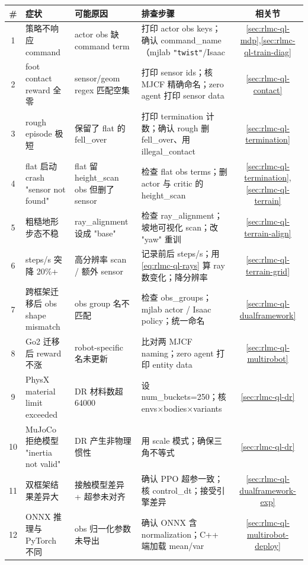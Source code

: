 \begin{center}
\small
\begin{tabular}{@{}cp{3.2cm}p{3.4cm}p{4.2cm}c@{}}
\toprule
\# & 症状 & 可能原因 & 排查步骤 & 相关节 \\
\midrule
1 & 策略不响应 command & actor obs 缺 command term & 打印 actor obs keys；确认 command\_name（mjlab \verb|"twist"|/Isaac \Verb[breaklines]|"base_velocity"|） & \cref{sec:rlmc-ql-mdp},\cref{sec:rlmc-ql-train-diag} \\
2 & foot contact reward 全零 & sensor/geom regex 匹配空集 & 打印 sensor ids；核 MJCF 精确命名；zero agent 打印 sensor data & \cref{sec:rlmc-ql-contact} \\
3 & rough episode 极短 & 保留了 flat 的 fell\_over & 打印 termination 计数；确认 rough 删 fell\_over、用 illegal\_contact & \cref{sec:rlmc-ql-termination} \\
4 & flat 启动 crash "sensor not found" & flat 留 height\_scan obs 但删了 sensor & 检查 flat obs terms；删 actor 与 critic 的 height\_scan & \cref{sec:rlmc-ql-termination},\cref{sec:rlmc-ql-terrain} \\
5 & 粗糙地形步态不稳 & ray\_alignment 设成 "base" & 检查 ray\_alignment；坡地可视化 scan；改 "yaw" 重训 & \cref{sec:rlmc-ql-terrain-align} \\
6 & steps/s 突降 20\%+ & 高分辨率 scan / 额外 sensor & 记录前后 steps/s；用 \eqref{eq:rlmc-ql-rays} 算 ray 数变化；降分辨率 & \cref{sec:rlmc-ql-terrain-grid} \\
7 & 跨框架迁移后 obs shape mismatch & obs group 名不匹配 & 检查 obs\_groups；mjlab actor / Isaac policy；统一命名 & \cref{sec:rlmc-ql-dualframework} \\
8 & Go2 迁移后 reward 不涨 & robot-specific 名未更新 & 比对两 MJCF naming；zero agent 打印 entity data & \cref{sec:rlmc-ql-multirobot} \\
9 & PhysX material limit exceeded & DR 材料数超 64000 & 设 num\_buckets=250；核 envs$\times$bodies$\times$variants & \cref{sec:rlmc-ql-dr} \\
10 & MuJoCo 拒绝模型 "inertia not valid" & DR 产生非物理惯性 & 用 scale 模式；确保三角不等式 & \cref{sec:rlmc-ql-dr} \\
11 & 双框架结果差异大 & 接触模型差异 + 超参未对齐 & 确认 PPO 超参一致；核 control\_dt；接受引擎差异 & \cref{sec:rlmc-ql-dualframework-exp} \\
12 & ONNX 推理与 PyTorch 不同 & obs 归一化参数未导出 & 确认 ONNX 含 normalization；C++ 端加载 mean/var & \cref{sec:rlmc-ql-multirobot-deploy} \\
\bottomrule
\end{tabular}
\end{center}

